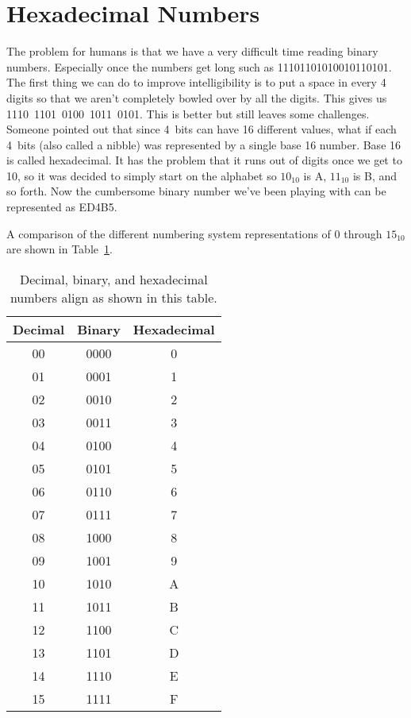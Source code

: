 \section{Hexadecimal Numbers}
The problem for humans is that we have a very difficult time reading binary numbers. Especially once the
numbers get long such as 11101101010010110101. The first thing we can do to improve intelligibility is to 
put a space in every 4 digits so that we aren't completely bowled over by all the digits. This gives us
1110~1101~0100~1011~0101. This is better but still leaves some challenges. Someone pointed out that since
4~bits can have 16 different values, what if each 4~bits (also called a nibble) was represented by a single
base 16 number. Base 16 is called hexadecimal. It has the problem that it runs out of digits once we get to 
10, so it was decided to simply start on the alphabet so $10_{10}$ is A, $11_{10}$ is B, and so forth. Now 
the cumbersome binary number we've been playing with can be represented as ED4B5. 

A comparison of the different numbering system representations of 0 through $15_{10}$ are shown in 
Table~\ref{table:numsystems}.

\begin{table}[!ht]
	\centering
	\begin{tabular}{c c c}
		\hline
		Decimal & Binary & Hexadecimal \\ 
		\hline
		00 & 0000 & 0 \\
		01 & 0001 & 1 \\
		02 & 0010 & 2 \\
		03 & 0011 & 3 \\
		04 & 0100 & 4 \\
		05 & 0101 & 5 \\
		06 & 0110 & 6 \\
		07 & 0111 & 7 \\
		08 & 1000 & 8 \\
		09 & 1001 & 9 \\
		10 & 1010 & A \\
		11 & 1011 & B \\
		12 & 1100 & C \\
		13 & 1101 & D \\
		14 & 1110 & E \\
		15 & 1111 & F \\
		\hline
	\end{tabular}
	\caption{Decimal, binary, and hexadecimal numbers align as shown in this table.}
	\label{table:numsystems}
\end{table}

